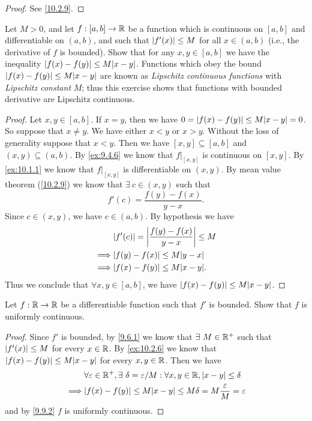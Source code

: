 \begin{proof}
  See \cref{10.2.9}.
\end{proof}

\begin{ex}\label{ex:10.2.6}
  Let \(M > 0\), and let \(f : [a, b] \to \mathbb{R}\) be a function which is continuous on \([a, b]\) and differentiable on \((a, b)\), and such that \(\left\lvert f'(x)\right\rvert \leq M\) for all \(x \in (a, b)\) (i.e., the derivative of \(f\) is bounded).
  Show that for any \(x, y \in [a, b]\) we have the inequality \(\abs{f(x) - f(y)} \leq M \abs{x - y}\).
  Functions which obey the bound \(\abs{f(x) - f(y)} \leq M \abs{x - y}\) are known as \emph{Lipschitz continuous functions} with \emph{Lipschitz constant} \(M\);
  thus this exercise shows that functions with bounded derivative are Lipschitz continuous.
\end{ex}

\begin{proof}
  Let \(x, y \in [a, b]\).
  If \(x = y\), then we have \(0 = \abs{f(x) - f(y)} \leq M \abs{x - y} = 0\).
  So suppose that \(x \neq y\).
  We have either \(x < y\) or \(x > y\).
  Without the loss of generality suppose that \(x < y\).
  Then we have \([x, y] \subseteq [a, b]\) and \((x, y) \subseteq (a, b)\).
  By \cref{ex:9.4.6} we know that \(f|_{[x, y]}\) is continuous on \([x, y]\).
  By \cref{ex:10.1.1} we know that \(f|_{[x, y]}\) is differentiable on \((x, y)\).
  By mean value theorem (\cref{10.2.9}) we know that \(\exists\ c \in (x, y)\) such that
  \[
    f'(c) = \frac{f(y) - f(x)}{y - x}.
  \]
  Since \(c \in (x, y)\), we have \(c \in (a, b)\).
  By hypothesis we have
  \begin{align*}
             & \abs{f'(c)} = \abs{\frac{f(y) - f(x)}{y - x}} \leq M \\
    \implies & \abs{f(y) - f(x)} \leq M \abs{y - x}                 \\
    \implies & \abs{f(x) - f(y)} \leq M \abs{x - y}.
  \end{align*}
  Thus we conclude that \(\forall x, y \in [a, b]\), we have \(\abs{f(x) - f(y)} \leq M \abs{x - y}\).
\end{proof}

\begin{ex}\label{ex:10.2.7}
  Let \(f : \mathbb{R} \to \mathbb{R}\) be a differentiable function such that \(f'\) is bounded.
  Show that \(f\) is uniformly continuous.
\end{ex}

\begin{proof}
  Since \(f'\) is bounded, by \cref{9.6.1} we know that \(\exists\ M \in \mathbb{R}^+\) such that \(\left\lvert f'(x)\right\rvert \leq M\) for every \(x \in \mathbb{R}\).
  By \cref{ex:10.2.6} we know that \(\abs{f(x) - f(y)} \leq M \abs{x - y}\) for every \(x, y \in \mathbb{R}\).
  Then we have
  \begin{align*}
             & \forall \varepsilon \in \R^+, \exists\ \delta = \varepsilon / M : \forall x, y \in \R, \abs{x - y} \leq \delta \\
    \implies & \abs{f(x) - f(y)} \leq M \abs{x - y} \leq M \delta = M \frac{\varepsilon}{M} = \varepsilon
  \end{align*}
  and by \cref{9.9.2} \(f\) is uniformly continuous.
\end{proof}